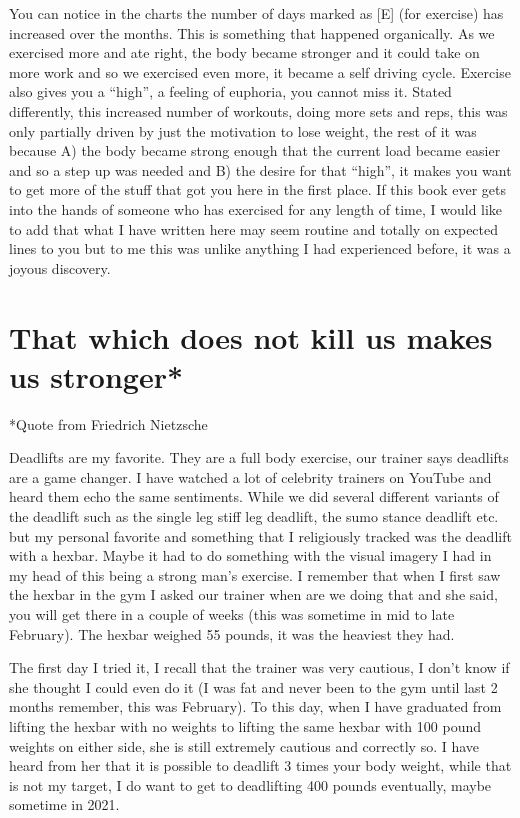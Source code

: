 \documentclass[
  oneside]{book}
\begin{document}
You can notice in the charts the number of days marked as {[}E{]} (for exercise) has increased over the months. This is something that happened organically. As we exercised more and ate right, the body became stronger and it could take on more work and so we exercised even more, it became a self driving cycle. Exercise also gives you a ``high'', a feeling of euphoria, you cannot miss it. Stated differently, this increased number of workouts, doing more sets and reps, this was only partially driven by just the motivation to lose weight, the rest of it was because A) the body became strong enough that the current load became easier and so a step up was needed and B) the desire for that ``high'', it makes you want to get more of the stuff that got you here in the first place. If this book ever gets into the hands of someone who has exercised for any length of time, I would like to add that what I have written here may seem routine and totally on expected lines to you but to me this was unlike anything I had experienced before, it was a joyous discovery.

\hypertarget{that-which-does-not-kill-us-makes-us-stronger}{%
\section{That which does not kill us makes us stronger*}\label{that-which-does-not-kill-us-makes-us-stronger}}

*Quote from Friedrich Nietzsche

Deadlifts are my favorite. They are a full body exercise, our trainer says deadlifts are a game changer. I have watched a lot of celebrity trainers on YouTube and heard them echo the same sentiments. While we did several different variants of the deadlift such as the single leg stiff leg deadlift, the sumo stance deadlift etc. but my personal favorite and something that I religiously tracked was the deadlift with a hexbar. Maybe it had to do something with the visual imagery I had in my head of this being a strong man's exercise. I remember that when I first saw the hexbar in the gym I asked our trainer when are we doing that and she said, you will get there in a couple of weeks (this was sometime in mid to late February). The hexbar weighed 55 pounds, it was the heaviest they had.

The first day I tried it, I recall that the trainer was very cautious, I don't know if she thought I could even do it (I was fat and never been to the gym until last 2 months remember, this was February). To this day, when I have graduated from lifting the hexbar with no weights to lifting the same hexbar with 100 pound weights on either side, she is still extremely cautious and correctly so. I have heard from her that it is possible to deadlift 3 times your body weight, while that is not my target, I do want to get to deadlifting 400 pounds eventually, maybe sometime in 2021.
\end{document}

